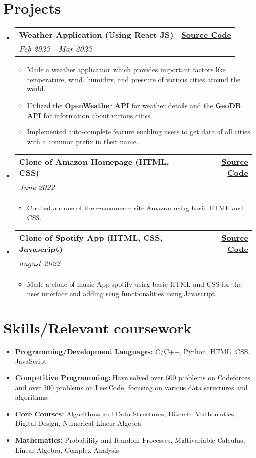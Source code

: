 \documentclass[letterpaper,11pt]{article}
\makeatletter
\newcommand{\resumeSubheading}[4]{
  \vspace{-1pt}\item
    \begin{tabular*}{0.97\textwidth}{l@{\extracolsep{\fill}}r}
      \textbf{#1} & #2 \\
      \textit{\small#3} & \textit{\small #4} \\
    \end{tabular*}\vspace{-5pt}
}
\newcommand{\resumeSubHeadingListStart}{\begin{itemize}[leftmargin=*]}
\newcommand{\resumeSubHeadingListEnd}{\end{itemize}}
\newcommand{\resumeItemListStart}{\begin{itemize}}
\newcommand{\resumeItemListEnd}{\end{itemize}\vspace{-5pt}}
\makeatother
\begin{document}
\section{Projects}
\resumeSubHeadingListStart
  \resumeSubheading
    {Weather Application (Using React JS)}{\href{https://github.com/hardik4555/react-weather}{\textbf{Source Code}}}
    {Feb 2023 - Mar 2023}{}
    \resumeItemListStart
      \item Made a weather application which provides important factors like temperature, wind, humidity, and pressure of various cities around the world.
      \item Utilized the {\textbf{OpenWeather API}} for weather details and the {\textbf{GeoDB API}} for information about various cities.
      \item Implemented auto-complete feature enabling users to get data of all cities with a common prefix in their name.
    \resumeItemListEnd
    
  \resumeSubheading
    {Clone of Amazon Homepage (HTML, CSS)}{\href{https://github.com/hardik4555/amazon-website-clone}{\textbf{Source Code}}}
    {June 2022}{}
    \resumeItemListStart
      \item Created a clone of the e-commerce site Amazon using basic HTML and CSS.
    \resumeItemListEnd

    \resumeSubheading
    {Clone of Spotify App (HTML, CSS, Javascript)}{\href{https://github.com/hardik4555/amazon-website-clone}{\textbf{Source Code}}}
    {august 2022}{}
    \resumeItemListStart
      \item Made a clone of music App spotify using basic HTML and CSS for the user interface and adding song functionalities using Javascript.
    \resumeItemListEnd
\resumeSubHeadingListEnd

\section{Skills/Relevant coursework}
\resumeSubHeadingListStart
  \item \textbf{Programming/Development Languages:} C/C++, Python, HTML, CSS, JavaScript
  \item \textbf{Competitive Programming:} Have solved over 600 problems on Codeforces and over 300 problems on LeetCode, focusing on various data structures and algorithms.
  \item \textbf{Core Courses:} Algorithms and Data Structures, Discrete Mathematics, Digital Design, Numerical Linear Algebra
  \item \textbf{Mathematics:} Probability and Random Processes, Multivariable Calculus, Linear Algebra, Complex Analysis
\resumeSubHeadingListEnd
\end{document}

